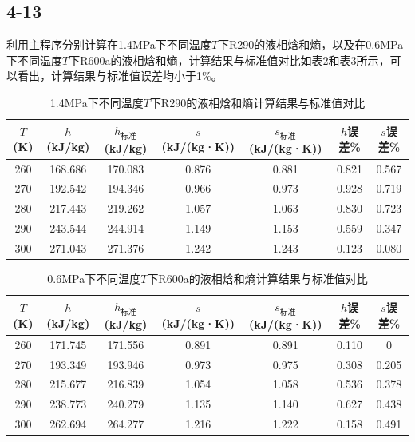 \documentclass[12pt,a4paper]{article}
\begin{document}
\subsection*{4-13}

利用主程序分别计算在1.4MPa下不同温度$T$下R290的液相焓和熵，以及在0.6MPa下不同温度$T$下R600a的液相焓和熵，计算结果与标准值对比如表2和表3所示，可以看出，计算结果与标准值误差均小于1\%。

\begin{table}[h]
\centering
\caption{1.4MPa下不同温度$T$下R290的液相焓和熵计算结果与标准值对比}
\begin{tabular}{c c c c c c c}
\hline
$T$ (K) & $h$ (kJ/kg) &$h_\text{标准}$(kJ/kg) & $s$ (kJ/(kg·K)) &$s_\text{标准}$(kJ/(kg·K))& $h$误差\%&$s$误差\%\\
\hline
260 & 168.686& 170.083& 0.876& 0.881& 0.821& 0.567\\
270 & 192.542& 194.346& 0.966& 0.973& 0.928& 0.719\\
280 & 217.443& 219.262& 1.057& 1.063& 0.830& 0.723\\
290 & 243.544& 244.914& 1.149& 1.153& 0.559& 0.347\\
300 & 271.043& 271.376& 1.242& 1.243& 0.123& 0.080\\
\hline
\end{tabular}
\end{table}

\begin{table}[h]
\centering
\caption{0.6MPa下不同温度$T$下R600a的液相焓和熵计算结果与标准值对比}
\begin{tabular}{c c c c c c c}
\hline
$T$ (K) & $h$ (kJ/kg) &$h_\text{标准}$(kJ/kg) & $s$ (kJ/(kg·K)) &$s_\text{标准}$(kJ/(kg·K))& $h$误差\%&$s$误差\%\\
\hline
260 & 171.745& 171.556& 0.891& 0.891& 0.110& 0\\
270 & 193.349& 193.946& 0.973& 0.975& 0.308& 0.205\\
280 & 215.677& 216.839& 1.054& 1.058& 0.536& 0.378\\
290 & 238.773& 240.279& 1.135& 1.140& 0.627& 0.438\\
300 & 262.694& 264.277& 1.216& 1.222& 0.158& 0.491\\
\hline
\end{tabular}
\end{table}
\end{document}
